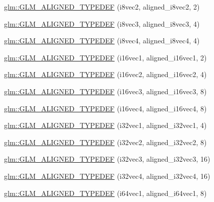 \begin{DoxyCompactItemize}
\item 
\hyperlink{group__gtx__type__aligned_ga25b3fe1d9e8d0a5e86c1949c1acd8131}{glm\-::\-G\-L\-M\-\_\-\-A\-L\-I\-G\-N\-E\-D\-\_\-\-T\-Y\-P\-E\-D\-E\-F} (i8vec2, aligned\-\_\-i8vec2, 2)
\item 
\hyperlink{group__gtx__type__aligned_ga2958f907719d94d8109b562540c910e2}{glm\-::\-G\-L\-M\-\_\-\-A\-L\-I\-G\-N\-E\-D\-\_\-\-T\-Y\-P\-E\-D\-E\-F} (i8vec3, aligned\-\_\-i8vec3, 4)
\item 
\hyperlink{group__gtx__type__aligned_ga1fe6fc032a978f1c845fac9aa0668714}{glm\-::\-G\-L\-M\-\_\-\-A\-L\-I\-G\-N\-E\-D\-\_\-\-T\-Y\-P\-E\-D\-E\-F} (i8vec4, aligned\-\_\-i8vec4, 4)
\item 
\hyperlink{group__gtx__type__aligned_gaa4161e7a496dc96972254143fe873e55}{glm\-::\-G\-L\-M\-\_\-\-A\-L\-I\-G\-N\-E\-D\-\_\-\-T\-Y\-P\-E\-D\-E\-F} (i16vec1, aligned\-\_\-i16vec1, 2)
\item 
\hyperlink{group__gtx__type__aligned_ga9d7cb211ccda69b1c22ddeeb0f3e7aba}{glm\-::\-G\-L\-M\-\_\-\-A\-L\-I\-G\-N\-E\-D\-\_\-\-T\-Y\-P\-E\-D\-E\-F} (i16vec2, aligned\-\_\-i16vec2, 4)
\item 
\hyperlink{group__gtx__type__aligned_gaaee91dd2ab34423bcc11072ef6bd0f02}{glm\-::\-G\-L\-M\-\_\-\-A\-L\-I\-G\-N\-E\-D\-\_\-\-T\-Y\-P\-E\-D\-E\-F} (i16vec3, aligned\-\_\-i16vec3, 8)
\item 
\hyperlink{group__gtx__type__aligned_ga49f047ccaa8b31fad9f26c67bf9b3510}{glm\-::\-G\-L\-M\-\_\-\-A\-L\-I\-G\-N\-E\-D\-\_\-\-T\-Y\-P\-E\-D\-E\-F} (i16vec4, aligned\-\_\-i16vec4, 8)
\item 
\hyperlink{group__gtx__type__aligned_ga904e9c2436bb099397c0823506a0771f}{glm\-::\-G\-L\-M\-\_\-\-A\-L\-I\-G\-N\-E\-D\-\_\-\-T\-Y\-P\-E\-D\-E\-F} (i32vec1, aligned\-\_\-i32vec1, 4)
\item 
\hyperlink{group__gtx__type__aligned_gaf90651cf2f5e7ee2b11cfdc5a6749534}{glm\-::\-G\-L\-M\-\_\-\-A\-L\-I\-G\-N\-E\-D\-\_\-\-T\-Y\-P\-E\-D\-E\-F} (i32vec2, aligned\-\_\-i32vec2, 8)
\item 
\hyperlink{group__gtx__type__aligned_ga7354a4ead8cb17868aec36b9c30d6010}{glm\-::\-G\-L\-M\-\_\-\-A\-L\-I\-G\-N\-E\-D\-\_\-\-T\-Y\-P\-E\-D\-E\-F} (i32vec3, aligned\-\_\-i32vec3, 16)
\item 
\hyperlink{group__gtx__type__aligned_gad2ecbdea18732163e2636e27b37981ee}{glm\-::\-G\-L\-M\-\_\-\-A\-L\-I\-G\-N\-E\-D\-\_\-\-T\-Y\-P\-E\-D\-E\-F} (i32vec4, aligned\-\_\-i32vec4, 16)
\item 
\hyperlink{group__gtx__type__aligned_ga965b1c9aa1800e93d4abc2eb2b5afcbf}{glm\-::\-G\-L\-M\-\_\-\-A\-L\-I\-G\-N\-E\-D\-\_\-\-T\-Y\-P\-E\-D\-E\-F} (i64vec1, aligned\-\_\-i64vec1, 8)

\end{DoxyCompactItemize}
